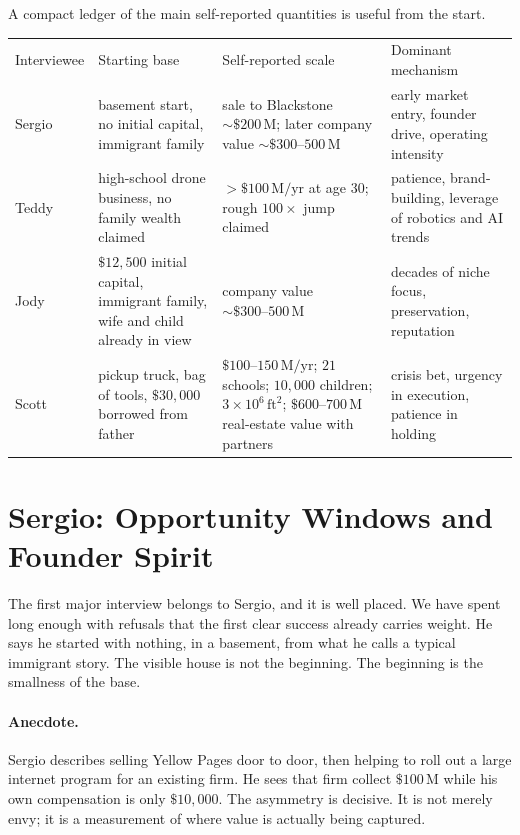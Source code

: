 A compact ledger of the main self-reported quantities is useful from the start.

\begin{table}[h]
\centering
\begin{tabular}{p{1.8cm}p{2.6cm}p{4.1cm}p{4.1cm}}
Interviewee & Starting base & Self-reported scale & Dominant mechanism \\
Sergio & basement start, no initial capital, immigrant family & sale to Blackstone \(\sim \$200\,\mathrm{M}\); later company value \(\sim \$300\text{--}500\,\mathrm{M}\) & early market entry, founder drive, operating intensity \\
Teddy & high-school drone business, no family wealth claimed & \(>\$100\,\mathrm{M/yr}\) at age \(30\); rough \(100\times\) jump claimed & patience, brand-building, leverage of robotics and AI trends \\
Jody & \(\$12{,}500\) initial capital, immigrant family, wife and child already in view & company value \(\sim \$300\text{--}500\,\mathrm{M}\) & decades of niche focus, preservation, reputation \\
Scott & pickup truck, bag of tools, \(\$30{,}000\) borrowed from father & \(\$100\text{--}150\,\mathrm{M/yr}\); \(21\) schools; \(10{,}000\) children; \(3\times10^6\,\mathrm{ft}^2\); \(\$600\text{--}700\,\mathrm{M}\) real-estate value with partners & crisis bet, urgency in execution, patience in holding \\
\end{tabular}
\end{table}

\section{Sergio: Opportunity Windows and Founder Spirit}

The first major interview belongs to Sergio, and it is well placed. We have spent long enough with refusals that the first clear success already carries weight. He says he started with nothing, in a basement, from what he calls a typical immigrant story. The visible house is not the beginning. The beginning is the smallness of the base.

\paragraph{Anecdote.}
Sergio describes selling Yellow Pages door to door, then helping to roll out a large internet program for an existing firm. He sees that firm collect \(\$100\,\mathrm{M}\) while his own compensation is only \(\$10{,}000\). The asymmetry is decisive. It is not merely envy; it is a measurement of where value is actually being captured.

